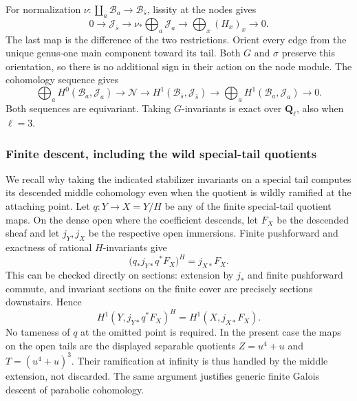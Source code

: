 For normalization $\nu:\coprod_a\mathcal B_a\to\mathcal B_{\bar s}$,
lissity at the nodes gives
\[
 0\longrightarrow\mathcal J_{\bar s}
 \longrightarrow\nu_*\bigoplus_a\mathcal J_a
 \longrightarrow\bigoplus_x(H_x)_x\longrightarrow0.
\]
The last map is the difference of the two restrictions. Orient every
edge from the unique genus-one main component toward its tail. Both
$G$ and $\sigma$ preserve this orientation, so there is no additional
sign in their action on the node module. The cohomology sequence gives
\begin{equation}\label{p2:eq:complete-p2-normalization}
 \bigoplus_a H^0(\mathcal B_a,\mathcal J_a)
 \longrightarrow\mathcal N
 \longrightarrow H^1(\mathcal B_{\bar s},\mathcal J_{\bar s})
 \longrightarrow\bigoplus_a H^1(\mathcal B_a,\mathcal J_a)
 \longrightarrow0.
\end{equation}
Both sequences are equivariant. Taking $G$-invariants is exact over
$\mathbf Q_\ell$, also when $\ell=3$.

\subsubsection{Finite descent, including the wild special-tail quotients}

We recall why taking the indicated stabilizer invariants on a special
tail computes its descended middle cohomology even when the quotient
is wildly ramified at the attaching point. Let
$q:Y\to X=Y/H$ be any of the finite special-tail quotient maps.
On the dense open where the coefficient descends, let $F_X$ be the
descended sheaf and let $j_Y,j_X$ be the respective open immersions.
Finite pushforward and exactness of rational $H$-invariants give
\[
 \bigl(q_*j_{Y*}q^*F_X\bigr)^H=j_{X*}F_X.
\]
This can be checked directly on sections: extension by $j_*$ and
finite pushforward commute, and invariant sections on the finite
cover are precisely sections downstairs. Hence
\[
 H^1(Y,j_{Y*}q^*F_X)^H=H^1(X,j_{X*}F_X).
\]
No tameness of $q$ at the omitted point is required. In the present
case the maps on the open tails are the displayed separable quotients
$Z=u^4+u$ and $T=(u^4+u)^3$. Their ramification at infinity is thus
handled by the middle extension, not discarded. The same argument
justifies generic finite Galois descent of parabolic cohomology.


